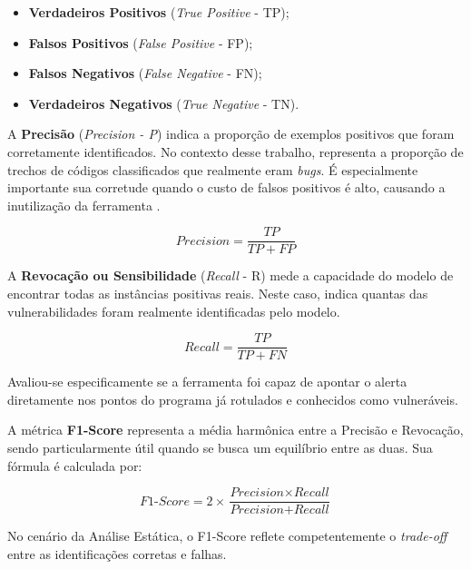 \documentclass[
    12pt,                %
    openright,           %
    oneside,             %
    a4paper,             %
    english,             %
    brazil               %
]{abntex2}
\begin{document}
\begin{itemize}
  \item \textbf{Verdadeiros Positivos} (\textit{True Positive} - TP);
  \item \textbf{Falsos Positivos} (\textit{False Positive} - FP);
  \item \textbf{Falsos Negativos} (\textit{False Negative} - FN);
  \item \textbf{Verdadeiros Negativos} (\textit{True Negative} - TN).
\end{itemize}
\par
A \textbf{Precisão} (\textit{Precision - P}) indica a proporção de exemplos positivos que foram corretamente identificados.
No contexto desse trabalho, representa a proporção de trechos de códigos classificados que realmente eram \textit{bugs}.
É especialmente importante sua corretude quando o custo de falsos positivos é alto, causando a inutilização da ferramenta \cite{aho2007compilers}.

\begin{equation}
  \textit{Precision} = \frac{TP}{TP + FP}
\end{equation}

\vspace{\onelineskip}
\par
A \textbf{Revocação ou Sensibilidade} (\textit{Recall} - R) mede a capacidade do modelo de encontrar todas as instâncias positivas reais.
Neste caso, indica quantas das vulnerabilidades foram realmente identificadas pelo modelo.

\begin{equation}
  \textit{Recall} = \frac{TP}{TP + FN}
\end{equation}

\vspace{\onelineskip}
\par
Avaliou-se especificamente se a ferramenta foi capaz de apontar o alerta diretamente nos pontos do programa já rotulados e conhecidos como vulneráveis.
\par
A métrica \textbf{F1-Score} representa a média harmônica entre a Precisão e Revocação, sendo particularmente útil quando se busca um equilíbrio entre as duas.
Sua fórmula é calculada por:

\begin{equation}
  \textit{F1-Score} = 2 \times \frac{\textit{Precision} \times \textit{Recall}}{\textit{Precision} + \textit{Recall}}
\end{equation}

\vspace{\onelineskip}
\par
No cenário da Análise Estática, o F1-Score reflete competentemente o \textit{trade-off} entre as identificações corretas e falhas.
\end{document}
